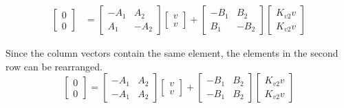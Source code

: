\begin{align*}
\begin{bmatrix}
    0 \\
    0
  \end{bmatrix} &=
    \begin{bmatrix}
      -A_1 & A_2 \\
      A_1 & -A_2
    \end{bmatrix}
    \begin{bmatrix}
      v \\
      v
    \end{bmatrix} +
    \begin{bmatrix}
      -B_1 & B_2 \\
      B_1 & -B_2
    \end{bmatrix}
    \begin{bmatrix}
      K_{v2} v \\
      K_{v2} v
    \end{bmatrix}
\end{align*}

Since the column vectors contain the same element, the elements in the second
row can be rearranged.
\begin{equation*}
  \begin{bmatrix}
    0 \\
    0
  \end{bmatrix} =
  \begin{bmatrix}
    -A_1 & A_2 \\
    -A_1 & A_2
  \end{bmatrix}
  \begin{bmatrix}
    v \\
    v
  \end{bmatrix} +
  \begin{bmatrix}
    -B_1 & B_2 \\
    -B_1 & B_2
  \end{bmatrix}
  \begin{bmatrix}
    K_{v2} v \\
    K_{v2} v
  \end{bmatrix}
\end{equation*}

